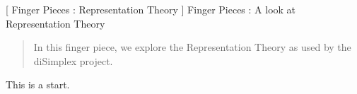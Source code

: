 
[
  Finger Pieces : Representation Theory
]{
  Finger Pieces : A look at Representation Theory
}
\author{Stephen Gaito}

\maketitle

\begin{abstract}
  In this finger piece, we explore the Representation Theory as used by the
  diSimplex project.
\end{abstract}

This is a start.
